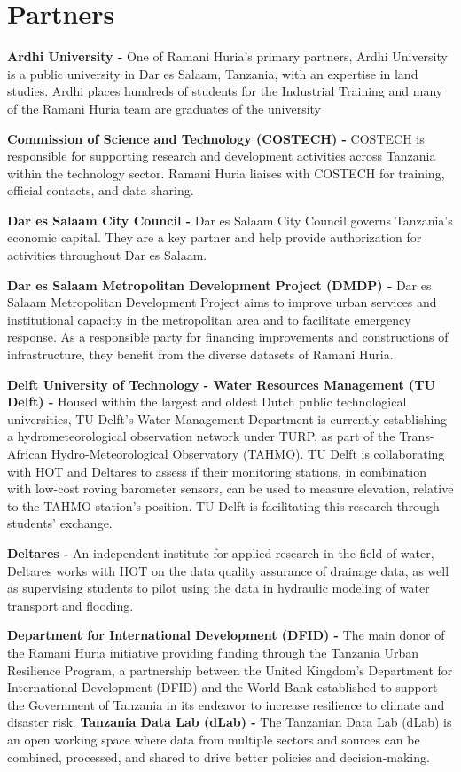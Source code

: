\documentclass[a4paper,12pt,twoside]{article}
\begin{document}
\section{Partners}
\begin{multicols}
\medskip
\textbf{Ardhi University -} One of Ramani Huria’s primary partners, Ardhi University is a public university in Dar es Salaam, Tanzania, with an expertise in land studies. Ardhi places hundreds of students for the Industrial Training and many of the Ramani Huria team are graduates of the university

\textbf{Commission of Science and Technology (COSTECH) -} COSTECH is responsible for supporting research and development activities across Tanzania within the technology sector. Ramani Huria liaises with COSTECH for training, official contacts, and data sharing.

\textbf{Dar es Salaam City Council -} Dar es Salaam City Council governs Tanzania’s economic capital. They are a key partner and help provide authorization for activities throughout Dar es Salaam. 

\textbf{Dar es Salaam Metropolitan Development Project (DMDP) -} Dar es Salaam Metropolitan Development Project aims to improve urban services and institutional capacity in the metropolitan area and to facilitate emergency response. As a responsible party for financing improvements and constructions of infrastructure, they benefit from the diverse datasets of Ramani Huria. 
\

\textbf{Delft University of Technology - Water Resources Management (TU Delft) -} Housed within the largest and oldest Dutch public technological universities, TU Delft's Water Management Department is currently establishing a hydrometeorological observation network under TURP, as part of the Trans-African Hydro-Meteorological Observatory (TAHMO). TU Delft is collaborating with HOT and Deltares to assess if their monitoring stations, in combination with low-cost roving barometer sensors, can be used to measure elevation, relative to the TAHMO station's position. TU Delft is facilitating this research through students’ exchange. 

\textbf{Deltares -} An independent institute for applied research in the field of water, Deltares works with HOT on the data quality assurance of drainage data, as well as supervising students to pilot using the data in hydraulic modeling of water transport and flooding. 

\textbf{Department for International Development (DFID) -} The main donor of the Ramani Huria initiative providing funding through the Tanzania Urban Resilience Program, a partnership between the United Kingdom’s Department for International Development (DFID) and the World Bank established to support the Government of Tanzania in its endeavor to increase resilience to climate and disaster risk. 
\textbf{Tanzania Data Lab (dLab) -} The Tanzanian Data Lab (dLab) is an open working space where data from multiple sectors and sources can be combined, processed, and shared to drive better policies and decision-making. 


\end{multicols}
\end{document}
